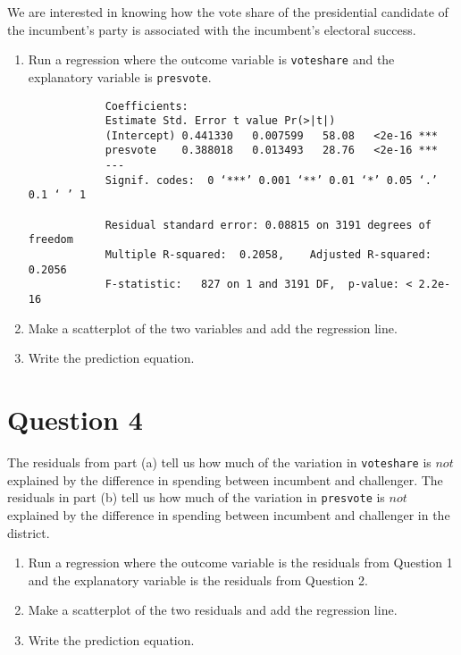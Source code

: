 \documentclass[12pt,letterpaper]{article}
\begin{document}
\noindent We are interested in knowing how the vote share of the presidential candidate of the incumbent's party is associated with the incumbent's electoral success.
	\vspace{.25cm}
	\begin{enumerate}
		\item Run a regression where the outcome variable is \texttt{voteshare} and the explanatory variable is \texttt{presvote}.
			\vspace{1cm}
			
			\begin{verbatim}
			Coefficients:
			Estimate Std. Error t value Pr(>|t|)    
			(Intercept) 0.441330   0.007599   58.08   <2e-16 ***
			presvote    0.388018   0.013493   28.76   <2e-16 ***
			---
			Signif. codes:  0 ‘***’ 0.001 ‘**’ 0.01 ‘*’ 0.05 ‘.’ 0.1 ‘ ’ 1
			
			Residual standard error: 0.08815 on 3191 degrees of freedom
			Multiple R-squared:  0.2058,	Adjusted R-squared:  0.2056 
			F-statistic:   827 on 1 and 3191 DF,  p-value: < 2.2e-16
		\end{verbatim}
			
		\item Make a scatterplot of the two variables and add the regression line. 
			\vspace{5cm}
		\item Write the prediction equation.
	\end{enumerate}
	

\newpage	
\section*{Question 4}
\noindent The residuals from part (a) tell us how much of the variation in \texttt{voteshare} is $not$ explained by the difference in spending between incumbent and challenger. The residuals in part (b) tell us how much of the variation in \texttt{presvote} is $not$ explained by the difference in spending between incumbent and challenger in the district.
	\begin{enumerate}
		\item Run a regression where the outcome variable is the residuals from Question 1 and the explanatory variable is the residuals from Question 2.	\vspace{6cm}
		\item Make a scatterplot of the two residuals and add the regression line. 	\vspace{6cm}
		\item Write the prediction equation.
	\end{enumerate}
	
\end{document}
